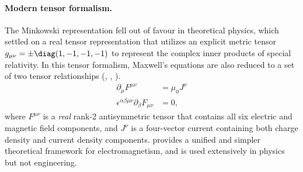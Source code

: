 \paragraph{Modern tensor formalism.}
The Minkowski representation fell out of favour in theoretical physics, which settled on a real tensor representation that utilizes an explicit metric tensor \( g_{\mu\nu} = \pm \diag(1, -1, -1, -1) \) to represent the complex inner products of special relativity.
In this tensor formalism, Maxwell's equations are also reduced to a set of two tensor relationships (\citep{landau1980classical},
\citep{jackson1975cew},
\citep{griffiths1999introduction}).
\begin{dmath}\label{eqn:manyfaces:40}
\begin{aligned}
\partial_\mu F^{\mu \nu} &= \mu_0 J^\nu \\
\epsilon^{\alpha \beta \mu \nu} \partial_\beta F_{\mu \nu} &= 0,
\end{aligned}
\end{dmath}
where \( F^{\mu\nu} \) is a \textit{real} rank-2 antisymmetric tensor that contains all six electric and magnetic field components, and \( J^\nu \) is a four-vector current containing both charge density and current density components.
 provides a unified and simpler theoretical framework for electromagnetism, and is used extensively in physics but not engineering.

